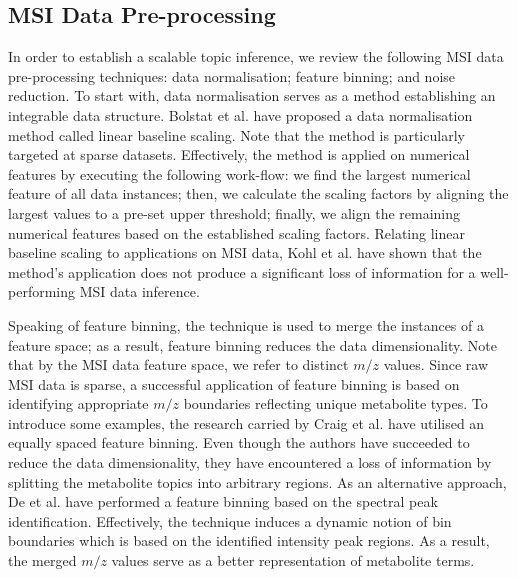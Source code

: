 \documentclass{mpaper}
\begin{document}
\subsection{MSI Data Pre-processing}


\par In order to establish a scalable topic inference, we review the following MSI data pre-processing techniques: data normalisation; feature binning; and noise reduction. To start with, data normalisation serves as a method establishing an integrable data structure. Bolstat et al. \cite{bolstad2003comparison} have proposed a data normalisation method called linear baseline scaling. Note that the method is particularly targeted at sparse datasets. Effectively, the method is applied on numerical features by executing the following work-flow: we find the largest numerical feature of all data instances; then, we calculate the scaling factors by aligning the largest values to a pre-set upper threshold; finally, we align the remaining numerical features based on the established scaling factors. Relating linear baseline scaling to applications on MSI data, Kohl et al. \cite{kohl2012state} have shown that the method's application does not produce a significant loss of information for a well-performing MSI data inference. 

\par Speaking of feature binning, the technique is used to merge the instances of a feature space; as a result, feature binning reduces the data dimensionality. Note that by the MSI data feature space, we refer to distinct $m/z$ values. Since raw MSI data is sparse, a successful application of feature binning is based on identifying appropriate $m/z$ boundaries reflecting unique metabolite types. To introduce some examples, the research carried by Craig et al. \cite{craig2006scaling} have utilised an equally spaced feature binning. Even though the authors have succeeded to reduce the data dimensionality, they have encountered a loss of information by splitting the metabolite topics into arbitrary regions. As an alternative approach, De et al. \cite{de2008nmr} have performed a feature binning based on the spectral peak identification. Effectively, the technique induces a dynamic notion of bin boundaries which is based on the identified intensity peak regions. As a result, the merged $m/z$ values serve as a better representation of metabolite terms.
\end{document}
